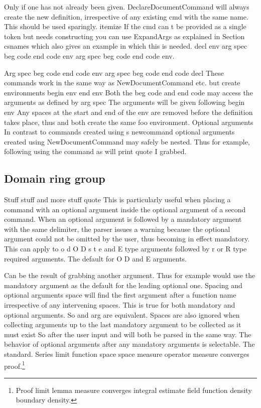 \documentclass{article}
\begin{document}
Only if one has not already been given. DeclareDocumentCommand will always create the new definition, irrespective of any existing cmd with the same name. This should be used sparingly. itemize If the cmd can t be provided as a single token but needs constructing you can use ExpandArgs as explained in Section csnames which also gives an example in which this is needed. decl env arg spec beg code end code env arg spec beg code end code env.

Arg spec beg code end code env arg spec beg code end code decl These commands work in the same way as NewDocumentCommand etc. but create environments begin env end env Both the beg code and end code may access the arguments as defined by arg spec The arguments will be given following begin env Any spaces at the start and end of the env are removed before the definition takes place, thus and both create the same foo environment. Optional arguments In contrast to commands created using s newcommand optional arguments created using NewDocumentCommand may safely be nested. Thus for example, following using the command as will print quote I grabbed.

\subsection{Domain ring group}
Stuff stuff and more stuff quote This is particularly useful when placing a command with an optional argument inside the optional argument of a second command. When an optional argument is followed by a mandatory argument with the same delimiter, the parser issues a warning because the optional argument could not be omitted by the user, thus becoming in effect mandatory. This can apply to o d O D s t e and E type arguments followed by r or R type required arguments. The default for O D and E arguments.

Can be the result of grabbing another argument. Thus for example would use the mandatory argument as the default for the leading optional one. Spacing and optional arguments space will find the first argument after a function name irrespective of any intervening spaces. This is true for both mandatory and optional arguments. So and arg are equivalent. Spaces are also ignored when collecting arguments up to the last mandatory argument to be collected as it must exist So after the user input and will both be parsed in the same way. The behavior of optional arguments after any mandatory arguments is selectable. The standard.
Series limit function space space measure operator measure converges proof.\footnote{Proof limit lemma measure converges integral estimate field function density boundary density.}
\end{document}
